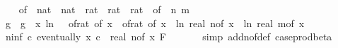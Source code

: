 \begin{isabellebody}
\ \ \isamarkupfalse%
\ {\isasymdelta}{\isacharunderscore}{\kern0pt}of\ {\isacharcolon}{\kern0pt}{\isacharcolon}{\kern0pt}\ {\isachardoublequoteopen}nat\ {\isasymtimes}\ nat\ {\isasymtimes}\ rat\ {\isasymtimes}\ rat\ {\isasymRightarrow}\ rat{\isachardoublequoteclose}\ \ {\isachardoublequoteopen}{\isasymdelta}{\isacharunderscore}{\kern0pt}of\ {\isacharequal}{\kern0pt}\ {\isacharparenleft}{\kern0pt}{\isasymlambda}{\isacharparenleft}{\kern0pt}n{\isacharcomma}{\kern0pt}\ m{\isacharcomma}{\kern0pt}\ {\isasymepsilon}{\isacharcomma}{\kern0pt}\ {\isasymdelta}{\isacharparenright}{\kern0pt}{\isachardot}{\kern0pt}\ {\isasymdelta}{\isacharparenright}{\kern0pt}{\isachardoublequoteclose}\isanewline
\isanewline
\ \ \isamarkupfalse%
\ g\ \ {\isachardoublequoteopen}g\ {\isacharequal}{\kern0pt}\ {\isacharparenleft}{\kern0pt}{\isasymlambda}x{\isachardot}{\kern0pt}\ {\isacharparenleft}{\kern0pt}ln\ {\isacharparenleft}{\kern0pt}{}\ {\isacharslash}{\kern0pt}\ of{\isacharunderscore}{\kern0pt}rat\ {\isacharparenleft}{\kern0pt}{\isasymepsilon}{\isacharunderscore}{\kern0pt}of\ x{\isacharparenright}{\kern0pt}{\isacharparenright}{\kern0pt}{\isacharparenright}{\kern0pt}\ {\isacharslash}{\kern0pt}\ {\isacharparenleft}{\kern0pt}of{\isacharunderscore}{\kern0pt}rat\ {\isacharparenleft}{\kern0pt}{\isasymdelta}{\isacharunderscore}{\kern0pt}of\ x{\isacharparenright}{\kern0pt}{\isacharparenright}{\kern0pt}\ {\isacharasterisk}{\kern0pt}\ {\isacharparenleft}{\kern0pt}ln\ {\isacharparenleft}{\kern0pt}real\ {\isacharparenleft}{\kern0pt}n{\isacharunderscore}{\kern0pt}of\ x{\isacharparenright}{\kern0pt}{\isacharparenright}{\kern0pt}\ {\isacharplus}{\kern0pt}\ ln\ {\isacharparenleft}{\kern0pt}real\ {\isacharparenleft}{\kern0pt}m{\isacharunderscore}{\kern0pt}of\ x{\isacharparenright}{\kern0pt}{\isacharparenright}{\kern0pt}{\isacharparenright}{\kern0pt}{\isacharparenright}{\kern0pt}{\isachardoublequoteclose}\isanewline
\isanewline
\ \ \isamarkupfalse%
\ n{\isacharunderscore}{\kern0pt}inf{\isacharcolon}{\kern0pt}\ {\isachardoublequoteopen}{\isasymAnd}c{\isachardot}{\kern0pt}\ eventually\ {\isacharparenleft}{\kern0pt}{\isasymlambda}x{\isachardot}{\kern0pt}\ c\ {\isasymle}\ {\isacharparenleft}{\kern0pt}real\ {\isacharparenleft}{\kern0pt}n{\isacharunderscore}{\kern0pt}of\ x{\isacharparenright}{\kern0pt}{\isacharparenright}{\kern0pt}{\isacharparenright}{\kern0pt}\ {\isacharquery}{\kern0pt}F{\isachardoublequoteclose}\ \isanewline
\ \ \ \ \isamarkupfalse%
\ {\isacharparenleft}{\kern0pt}simp\ add{\isacharcolon}{\kern0pt}n{\isacharunderscore}{\kern0pt}of{\isacharunderscore}{\kern0pt}def\ case{\isacharunderscore}{\kern0pt}prod{\isacharunderscore}{\kern0pt}beta{\isacharprime}{\kern0pt}{\isacharparenright}{\kern0pt}\isanewline

\end{isabellebody}
